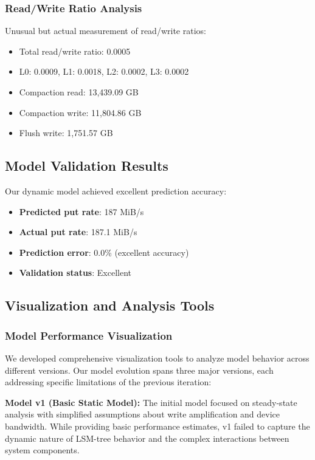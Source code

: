 \documentclass[11pt]{article}
\begin{document}
\subsubsection{Read/Write Ratio Analysis}
Unusual but actual measurement of read/write ratios:
\begin{itemize}
    \item Total read/write ratio: 0.0005
    \item L0: 0.0009, L1: 0.0018, L2: 0.0002, L3: 0.0002
    \item Compaction read: 13,439.09 GB
    \item Compaction write: 11,804.86 GB
    \item Flush write: 1,751.57 GB
\end{itemize}

\subsection{Model Validation Results}

Our dynamic model achieved excellent prediction accuracy:
\begin{itemize}
    \item \textbf{Predicted put rate}: 187 MiB/s
    \item \textbf{Actual put rate}: 187.1 MiB/s
    \item \textbf{Prediction error}: 0.0\% (excellent accuracy)
    \item \textbf{Validation status}: Excellent
\end{itemize}

\subsection{Visualization and Analysis Tools}

\subsubsection{Model Performance Visualization}
We developed comprehensive visualization tools to analyze model behavior across different versions. Our model evolution spans three major versions, each addressing specific limitations of the previous iteration:

\textbf{Model v1 (Basic Static Model):} The initial model focused on steady-state analysis with simplified assumptions about write amplification and device bandwidth. While providing basic performance estimates, v1 failed to capture the dynamic nature of LSM-tree behavior and the complex interactions between system components.
\end{document}
